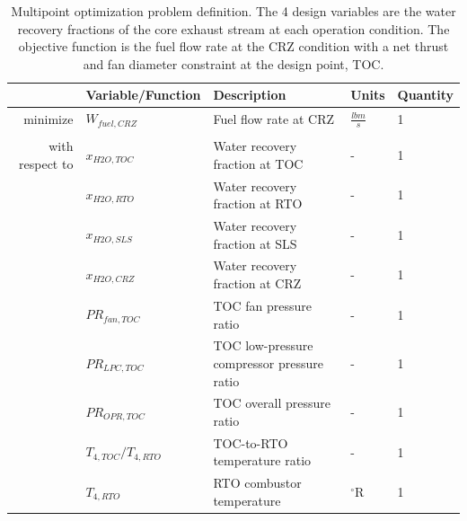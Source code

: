 \documentclass[conf]{new-aiaa}
\begin{document}
\begin{table}[h]
    \centering
    \caption{
        Multipoint optimization problem definition.
        The 4 design variables are the water recovery fractions of the core exhaust stream at each operation condition.
        The objective function is the fuel flow rate at the CRZ condition with a net thrust and fan diameter constraint at the design point, TOC.
    }
    \small
    \renewcommand{\arraystretch}{1.2}
    \begin{tabular}{r l l l l}
        \toprule
                        & Variable/Function           & Description                                & Units           & Quantity \\
        \hline
        minimize        & $W_{fuel,CRZ}$              & Fuel flow rate at CRZ                      & $\frac{lbm}{s}$ & 1        \\
                        &                             &                                            &                 &          \\
        with respect to & $x_{H2O,TOC}$               & Water recovery fraction at TOC             & -               & 1        \\
                        & $x_{H2O,RTO}$               & Water recovery fraction at RTO             & -               & 1        \\
                        & $x_{H2O,SLS}$               & Water recovery fraction at SLS             & -               & 1        \\
                        & $x_{H2O,CRZ}$               & Water recovery fraction at CRZ             & -               & 1        \\
                        & $PR_{fan,TOC}$              & TOC fan pressure ratio                     & -               & 1        \\
                        & $PR_{LPC,TOC}$              & TOC low-pressure compressor pressure ratio & -               & 1        \\
                        & $PR_{OPR,TOC}$              & TOC overall pressure ratio                 & -               & 1        \\
                        & $T_{4,TOC}/T_{4,RTO}$       & TOC-to-RTO temperature ratio               & -               & 1        \\
                        & $T_{4,RTO}$                 & RTO combustor temperature                  & $^\circ$R       & 1        \\

\end{tabular}
\end{table}
\end{document}
